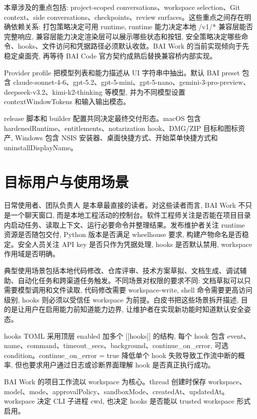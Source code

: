 本章涉及的重点包括: project-scoped conversations、workspace selection、Git context、side conversations、checkpoints、review surfaces。这些重点之间存在明确依赖关系: 打包策略决定可用 runtime, runtime 能力决定本地 /v1/* 兼容层能否完整响应, 兼容层能力决定渲染层可以展示哪些状态和按钮, 安全策略决定哪些命令、hooks、文件访问和凭据路径必须默认收敛。BAI Work 的当前实现倾向于先稳定桌面壳, 再等待 BAI Code 官方契约成熟后替换兼容桥内部实现。

Provider profile 把模型列表和能力描述从 UI 字符串中抽出。默认 BAI preset 包含 claude-sonnet-4-6、gpt-5.2、gpt-5-mini、gpt-5-nano、gemini-3-pro-preview、deepseek-v3.2、kimi-k2-thinking 等模型, 并为不同模型设置 contextWindowTokens 和输入输出模态。

release 脚本和 builder 配置共同决定最终交付形态。macOS 包含 hardenedRuntime、entitlements、notarization hook、DMG/ZIP 目标和图标资产, Windows 包含 NSIS 安装器、桌面快捷方式、开始菜单快捷方式和 uninstallDisplayName。

\section{目标用户与使用场景}
日常使用者、团队负责人 是本章最直接的读者。对这些读者而言, BAI Work 不只是一个聊天窗口, 而是本地工程活动的控制台。软件工程师关注是否能在项目目录内启动任务、读取上下文、运行必要命令并整理结果。发布维护者关注 runtime 资源是否随包交付, Python 版本是否满足 wheelhouse 要求, 构建产物命名是否稳定。安全人员关注 API key 是否只作为凭据处理, hooks 是否默认禁用, workspace 作用域是否明确。

典型使用场景包括本地代码修改、仓库评审、技术方案草拟、文档生成、调试辅助、自动化任务和跨渠道任务触发。不同场景对权限的要求不同: 文档草拟可以只需要模型调用和文件读取, 代码修改需要 workspace-write, shell 命令需要更高访问级别, hooks 则必须以受信任 workspace 为前提。白皮书把这些场景拆开描述, 目的是让用户在启用能力前知道能力边界, 让维护者在实现新功能时知道默认安全姿态。

hooks TOML 采用顶层 enabled 加多个 [[hooks]] 的结构, 每个 hook 包含 event、name、command、timeout\_secs、background、continue\_on\_error, 可选 condition。continue\_on\_error = true 降低单个 hook 失败导致工作流中断的概率, 但也要求用户通过日志或诊断界面理解 hook 是否真正执行成功。

BAI Work 的项目工作流以 workspace 为核心。thread 创建时保存 workspace、model、mode、approvalPolicy、sandboxMode、createdAt、updatedAt。workspace 决定 CLI 子进程 cwd, 也决定 hooks 是否能以 trusted workspace 形式启用。

